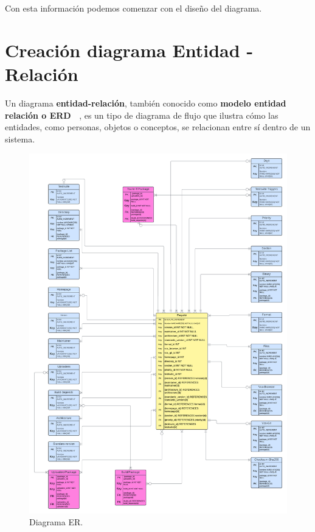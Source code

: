 \documentclass[a4paper, 12pt]{book}
\begin{document}
Con esta información podemos comenzar con el diseño del diagrama.

\section{Creación diagrama Entidad - Relación} 
\label{sec:diagrama_entidad_relacion}
Un diagrama \textbf {entidad-relación}, también conocido como \textbf {modelo entidad relación o ERD ~\cite{lucidchart:_diagramaERD}}, es un tipo de diagrama de flujo que ilustra cómo las entidades, como personas, objetos o conceptos, se relacionan entre sí dentro de un sistema.

\begin{figure}
	\centering
	\includegraphics[width=17cm, keepaspectratio]{img/Diagrama_ER.png}
	\caption{Diagrama ER.}
	\label{fig:entidad_relación}
\end{figure}
\end{document}
